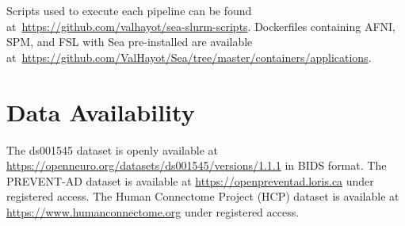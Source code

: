 \documentclass[fleqn,10pt]{wlscirep}
\begin{document}
    Scripts used to
    execute each pipeline can be found
    at~\url{https://github.com/valhayot/sea-slurm-scripts}. 
    Dockerfiles containing AFNI, SPM, and FSL with Sea pre-installed are available
    at~\url{https://github.com/ValHayot/Sea/tree/master/containers/applications}.

    \section{Data Availability}

    The ds001545 dataset is openly available at \url{https://openneuro.org/datasets/ds001545/versions/1.1.1} in BIDS format.
    The PREVENT-AD dataset is available at \url{https://openpreventad.loris.ca} under registered access.
    The Human Connectome Project (HCP) dataset is available at \url{https://www.humanconnectome.org} under registered access.

    
\end{document}
